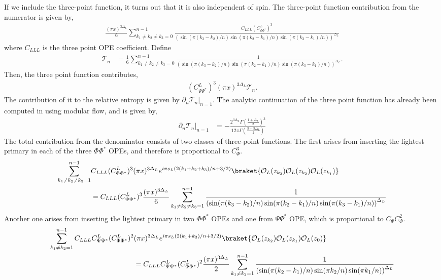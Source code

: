\documentclass[11pt]{article}
\newcommand{\p}{\partial}
\newcommand{\mO}{\mathcal{O}}
\newcommand{\nn}{\nonumber}
\newcommand{\lb}{\left(}
\newcommand{\rb}{\right)}
\begin{document}
If we include the three-point function, it turns out that it is also independent of spin.
The three-point function contribution from the numerator is given by,
\begin{align}
   \frac{(\pi x)^{3\Delta_L}}{6}\sum_{k_1\neq k_2\neq k_3 =0}^{n-1} \frac{C_{LLL}(C^L_{\Psi\Psi^*})^3}{\lb \sin(\pi (k_3 - k_2)/n) \sin (\pi (k_2 - k_1)/n) \sin(\pi (k_3-k_1)/n)\rb^{\Delta_L}}
\end{align}
where $C_{LLL}$ is the three point OPE coefficient.
Define 
\begin{align}
     \mathcal{T}_n &= \frac{1}{6}\sum_{k_1\neq k_2\neq k_3 =0}^{n-1} \frac{1}{\lb \sin(\pi (k_3 - k_2)/n) \sin (\pi (k_2 - k_1)/n) \sin(\pi (k_3-k_1)/n)\rb^{\Delta_L}}.
\end{align}
Then, the three point function contributes,
\begin{align}
    (C^L_{\Psi\Psi^*})^3(\pi x)^{3\Delta_L}\mathcal{T}_n.
\end{align}
The contribution of it to the relative entropy is given by $\p_n \mathcal{T}_n|_{n=1}$. The analytic continuation of the three point function has already been computed in \cite{S_rosi_2018} using modular flow, and is given by,
\begin{align}
    \p_n\mathcal{T}_n|_{n=1} &= -\frac{2^{3\Delta_L}\Gamma \lb\frac{1+\Delta_L}{2}\rb^3}{12\pi \Gamma\lb\frac{3+3\Delta_L}{2}\rb}
\end{align}
The total contribution from the denominator consists of two classes of three-point functions. The first arises from inserting the lightest primary in each of the three $\Phi \Phi^*$ OPEs, and therefore is proportional to $C_\Phi^3$. 
  \begin{align}
     \sum_{k_1 \neq k_2 \neq k_3 = 1}^{n-1} &C_{LLL}(C^L_{\Phi\Phi^*})^3(\pi x)^{3\Delta_L} e^{i\pi s_L(2(k_1 + k_2+k_3)/n + 3/2) }\braket{ \mO_L(z_{k_3})\mO_L(z_{k_2})\mO_L(z_{k_1})} \\
            & = C_{LLL}(C^L_{\Phi\Phi^*})^3\frac{(\pi x)^{3\Delta_L}}{6}\sum_{k_1 \neq k_2 \neq k_3= 1}^{n-1}\frac{1}{\lb \sin(\pi (k_3 - k_2)/n) \sin (\pi (k_2 - k_1)/n) \sin(\pi (k_3-k_1)/n)\rb^{\Delta_L}}
  \end{align}
  Another one arises from inserting the lightest primary in two $\Phi \Phi^*$ OPEs and one from $\Psi \Psi^*$ OPE, which is proportional to $C_\Psi C_\Phi^2$. 
    \begin{align}
       \sum_{k_1 \neq k_2 = 1}^{n-1}C_{LLL}C_{\Psi\Psi^*}^L (C^L_{\Phi\Phi^*})^2&(\pi x)^{3\Delta_L} e^{i\pi s_L(2(k_1 + k_2)/n + 3/2) }\braket{ \mO_L(z_{k_2})\mO_L(z_{k_1})\mO_L(z_{0})} \nn \\ 
       & = C_{LLL}C_{\Psi\Psi^*}^L (C^L_{\Phi\Phi^*})^2\frac{(\pi x)^{3\Delta_L}}{2}\sum_{k_1 \neq k_2 = 1}^{n-1}\frac{1}{\lb \sin(\pi (k_2 - k_1)/n) \sin (\pi k_2/n) \sin(\pi k_1/n)\rb^{\Delta_L}}
  \end{align}
\end{document}

